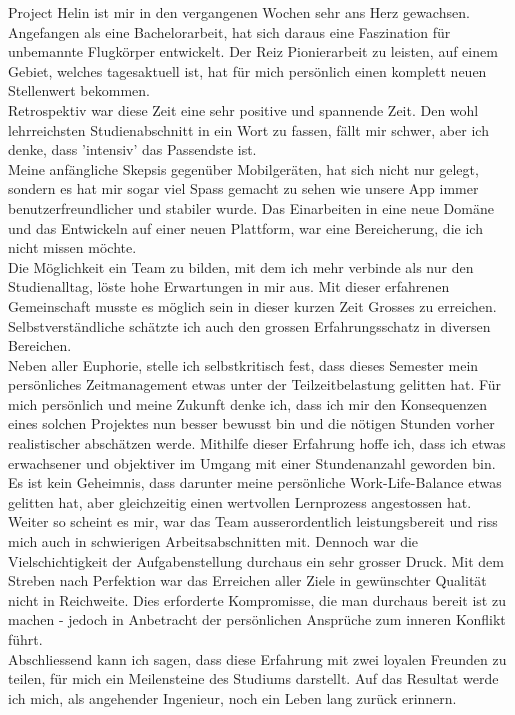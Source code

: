 Project Helin ist mir in den vergangenen Wochen sehr ans Herz gewachsen. Angefangen als eine Bachelorarbeit, hat sich daraus eine Faszination für unbemannte Flugkörper entwickelt. Der Reiz Pionierarbeit zu leisten, auf einem Gebiet, welches tagesaktuell ist, hat für mich persönlich einen komplett neuen Stellenwert bekommen. \\

Retrospektiv war diese Zeit eine sehr positive und spannende Zeit. Den wohl lehrreichsten Studienabschnitt in ein Wort zu fassen, fällt mir schwer, aber ich denke, dass 'intensiv' das Passendste ist. \\
Meine anfängliche Skepsis gegenüber Mobilgeräten, hat sich nicht nur gelegt, sondern es hat mir sogar viel Spass gemacht zu sehen wie unsere App immer benutzerfreundlicher und stabiler wurde. Das Einarbeiten in eine neue Domäne und das Entwickeln auf einer neuen Plattform, war eine Bereicherung, die ich nicht missen möchte. \\

Die Möglichkeit ein Team zu bilden, mit dem ich mehr verbinde als nur den Studienalltag, löste hohe Erwartungen in mir aus. Mit dieser erfahrenen Gemeinschaft musste es möglich sein in dieser kurzen Zeit Grosses zu erreichen. Selbstverständliche schätzte ich auch den grossen Erfahrungsschatz in diversen Bereichen. \\

Neben aller Euphorie, stelle ich selbstkritisch fest, dass dieses Semester mein persönliches Zeitmanagement etwas unter der Teilzeitbelastung gelitten hat. Für mich persönlich und meine Zukunft denke ich, dass ich mir den Konsequenzen eines solchen Projektes nun besser bewusst bin und die nötigen Stunden vorher realistischer abschätzen werde. Mithilfe dieser Erfahrung hoffe ich, dass ich etwas erwachsener und objektiver im Umgang mit einer Stundenanzahl geworden bin. Es ist kein Geheimnis, dass darunter meine persönliche Work-Life-Balance etwas gelitten hat, aber gleichzeitig einen wertvollen Lernprozess angestossen hat.
\\

Weiter so scheint es mir, war das Team ausserordentlich leistungsbereit und riss mich auch in schwierigen Arbeitsabschnitten mit. Dennoch war die Vielschichtigkeit der Aufgabenstellung durchaus ein sehr grosser Druck. Mit dem Streben nach Perfektion war das Erreichen aller Ziele in gewünschter Qualität nicht in Reichweite. Dies erforderte Kompromisse, die man durchaus bereit ist zu machen - jedoch in Anbetracht der persönlichen Ansprüche zum inneren Konflikt führt.
\\

Abschliessend kann ich sagen, dass diese Erfahrung mit zwei loyalen Freunden zu teilen, für mich ein Meilensteine des Studiums darstellt. Auf das Resultat werde ich mich, als angehender Ingenieur, noch ein Leben lang zurück erinnern.